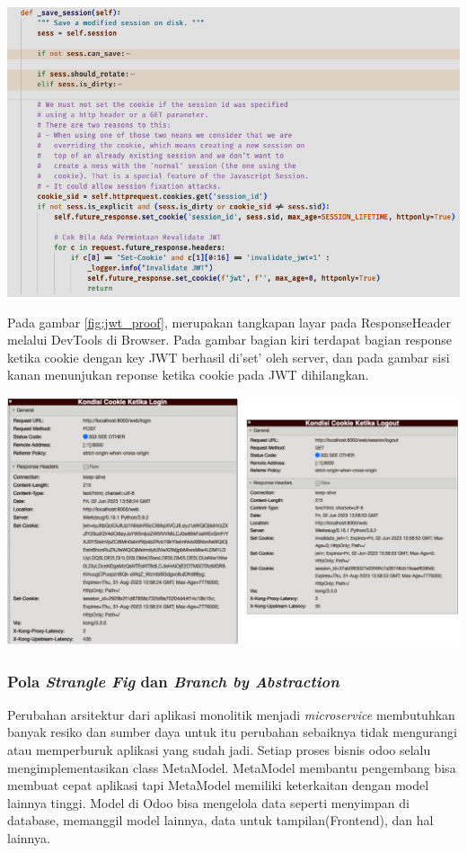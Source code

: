 \begin{center}
	\includegraphics[width=14cm]{img/bab_4/removeCookie.png}
	\label{fig:removeCookie}
\end{center}

Pada gambar \ref{fig:jwt_proof}, merupakan tangkapan layar pada ResponseHeader melalui DevTools di Browser. Pada gambar bagian kiri terdapat bagian response ketika cookie dengan key JWT berhasil di'set' oleh server, dan pada gambar sisi kanan menunjukan reponse ketika cookie pada JWT dihilangkan.

\begin{center}
	\includegraphics[width=14cm]{img/bab_4/jwt_proof.png}
	\label{fig:jwt_proof}
\end{center}


\subsubsection{Pola \textit{Strangle Fig} dan \textit{Branch by Abstraction}}
Perubahan arsitektur dari aplikasi monolitik menjadi \textit{microservice} membutuhkan banyak resiko dan sumber daya untuk itu perubahan sebaiknya tidak mengurangi atau memperburuk aplikasi yang sudah jadi. Setiap proses bisnis odoo selalu mengimplementasikan class MetaModel. MetaModel membantu pengembang bisa membuat cepat aplikasi tapi MetaModel memiliki keterkaitan dengan model lainnya tinggi. Model di Odoo bisa mengelola data seperti menyimpan di database, memanggil model lainnya, data untuk tampilan(Frontend), dan hal lainnya.


